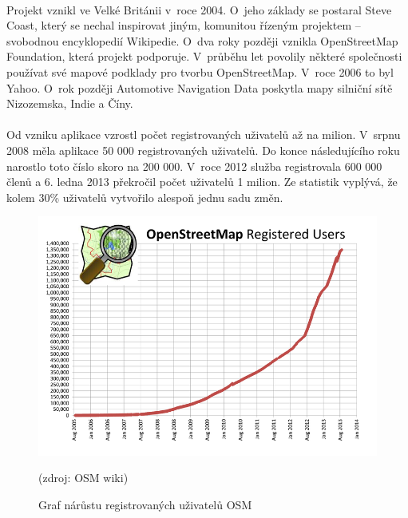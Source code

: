 \documentclass[11pt,a4paper,titlepage,oneside]{book}
\begin{document}
		\paragraph{}Projekt vznikl ve Velké Británii v~roce 2004. O~jeho základy se postaral Steve Coast, který se nechal inspirovat jiným, komunitou řízeným projektem -- svobodnou encyklopedií Wikipedie. O~dva roky později vznikla OpenStreetMap Foundation, která projekt podporuje. V~průběhu let povolily některé společnosti používat své mapové podklady pro tvorbu OpenStreetMap. V~roce 2006 to byl Yahoo. O~rok později Automotive Navigation Data poskytla mapy silniční sítě Nizozemska, Indie a Číny\cite{osm_wikipedia_en}.
		\paragraph{} Od vzniku aplikace vzrostl počet registrovaných uživatelů až na milion. V~srpnu 2008 měla aplikace 50 000 registrovaných uživatelů. Do konce násle\-dujícího roku narostlo toto číslo skoro na  200 000. V~roce 2012 služba registrovala 600 000 členů a 6. ledna 2013 překročil počet uživatelů 1 milion. Ze statistik vyplývá, že kolem 30\% uživatelů vytvořilo alespoň jednu sadu změn\cite{neis}.

                


		\begin{figure}[!h]
			\begin{center}
				\includegraphics[width=12cm]{obrazky/osm_stat_users.png}
				\caption{Graf nárůstu registrovaných uživatelů \ac{OSM}}
				 (zdroj: \ac{OSM} wiki\cite{osm_wiki_stats})
			\end{center}
		\end{figure}
\end{document}
